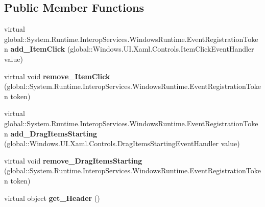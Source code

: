 \subsection*{Public Member Functions}
\begin{DoxyCompactItemize}
\item 
\mbox{\label{class_windows_1_1_u_i_1_1_xaml_1_1_controls_1_1_list_view_base_a91aed6f56d2fcd34719f771369fa7d13}} 
virtual global\+::\+System.\+Runtime.\+Interop\+Services.\+Windows\+Runtime.\+Event\+Registration\+Token {\bfseries add\+\_\+\+Item\+Click} (global\+::\+Windows.\+U\+I.\+Xaml.\+Controls.\+Item\+Click\+Event\+Handler value)
\item 
\mbox{\label{class_windows_1_1_u_i_1_1_xaml_1_1_controls_1_1_list_view_base_acc4288ea67ceb5d3c79dab6a268639f8}} 
virtual void {\bfseries remove\+\_\+\+Item\+Click} (global\+::\+System.\+Runtime.\+Interop\+Services.\+Windows\+Runtime.\+Event\+Registration\+Token token)
\item 
\mbox{\label{class_windows_1_1_u_i_1_1_xaml_1_1_controls_1_1_list_view_base_a85a658cab21ea353f8b12e255c61ffd0}} 
virtual global\+::\+System.\+Runtime.\+Interop\+Services.\+Windows\+Runtime.\+Event\+Registration\+Token {\bfseries add\+\_\+\+Drag\+Items\+Starting} (global\+::\+Windows.\+U\+I.\+Xaml.\+Controls.\+Drag\+Items\+Starting\+Event\+Handler value)
\item 
\mbox{\label{class_windows_1_1_u_i_1_1_xaml_1_1_controls_1_1_list_view_base_ad3ae84be415d5e14b9ab060cec7ced16}} 
virtual void {\bfseries remove\+\_\+\+Drag\+Items\+Starting} (global\+::\+System.\+Runtime.\+Interop\+Services.\+Windows\+Runtime.\+Event\+Registration\+Token token)
\item 
\mbox{\label{class_windows_1_1_u_i_1_1_xaml_1_1_controls_1_1_list_view_base_a23229b9cd6ccf8c31885dc9594c5df62}} 
virtual object {\bfseries get\+\_\+\+Header} ()
\item 
\mbox{\label{class_windows_1_1_u_i_1_1_xaml_1_1_controls_1_1_list_view_base_ac03683b52f206ce90a2d5585d50835c9}} 

\end{DoxyCompactItemize}
